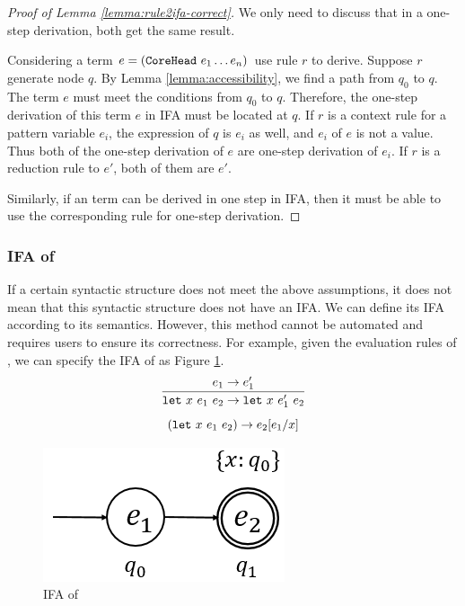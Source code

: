 \begin{proof}[Proof of Lemma \ref{lemma:rule2ifa-correct}]
    We only need to discuss that in a one-step derivation, both get the same result.

    Considering a term $e=(\mbox{\tt CoreHead}~e_1 \ldots e_n)$ use rule $r$ to derive. Suppose $r$ generate node $q$. By Lemma \ref{lemma:accessibility}, we find a path from $q_0$ to $q$. The term $e$ must meet the conditions from $q_0$ to $q$. Therefore, the one-step derivation of this term $e$ in IFA must be located at $q$. If $r$ is a context rule for a pattern variable $e_i$, the expression of $q$ is $e_i$ as well, and $e_i$ of $e$ is not a value. Thus both of the one-step derivation of $e$ are one-step derivation of $e_i$. If $r$ is a reduction rule to $e'$, both of them are $e'$.

    Similarly, if an term can be derived in one step in IFA, then it must be able to use the corresponding rule for one-step derivation.
\end{proof}

\subsubsection{IFA of }

If a certain syntactic structure does not meet the above assumptions, it does not mean that this syntactic structure does not have an IFA. We can define its IFA according to its semantics. However, this method cannot be automated and requires users to ensure its correctness. For example, given the evaluation rules of , we can specify the IFA of  as Figure \ref{fig:ifa-let}.
\[
    \infer{\m{let}~x~e_1~e_2 \to \m{let}~x~e_1'~e_2}{e_1 \to e_1'}
\]\[
    (\mbox{\tt let}~x~e_1~e_2) \to e_2[e_1/x]
\]


\begin{figure}[t]
    \centering
    \includegraphics[scale=0.25]{images/ifa/ifa-let.png}
    \caption{IFA of }
    \label{fig:ifa-let}
\end{figure}

